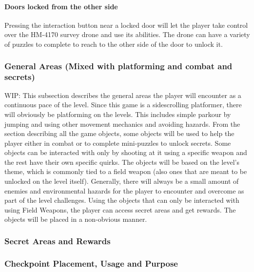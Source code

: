 \documentclass[12pt]{article}
\begin{document}
\paragraph{Doors locked from the other side}

Pressing the interaction button near a locked door will let the player take control over the HM-4170 survey drone and use its abilities. The drone can have a variety of puzzles to complete to reach to the other side of the door to unlock it. 

\subsubsection{General Areas (Mixed with platforming and combat and secrets)}

WIP: This subsection describes the general areas the player will encounter as a continuous pace of the level. Since this game is a sidescrolling platformer, there will obviously be platforming on the levels. This includes simple parkour by jumping and using other movement mechanics and avoiding hazards. From the section describing all the game objects, some objects will be used to help the player either in combat or to complete mini-puzzles to unlock secrets. Some objects can be interacted with only by shooting at it using a specific weapon and the rest have their own specific quirks. The objects will be based on the level's theme, which is commonly tied to a field weapon (also ones that are meant to be unlocked on the level itself). Generally, there will always be a small amount of enemies and environmental hazards for the player to encounter and overcome as part of the level challenges. Using the objects that can only be interacted with using Field Weapons, the player can access secret areas and get rewards. The objects will be placed in a non-obvious manner. 

\subsubsection{Secret Areas and Rewards}

\subsubsection{Checkpoint Placement, Usage and Purpose}
\end{document}
